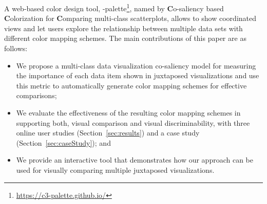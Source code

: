 A web-based color design tool, \toolname-palette\footnote{\small \url{https://c3-palette.github.io/}}, named by \textbf{C}o-saliency based \textbf{C}olorization for \textbf{C}omparing multi-class scatterplots, allows to show coordinated views and let users  explore the relationship between multiple data sets with different color mapping schemes.
The main contributions of this paper are as follows:
\begin{itemize}[noitemsep]
\setlength{\itemsep}{5pt}
  \item We propose a multi-class data visualization co-saliency model for measuring the importance of each data item shown in juxtaposed visualizations and use this metric to automatically generate color mapping schemes for effective comparisons;
   \item
   We evaluate the effectiveness of the resulting color mapping schemes in supporting both, visual comparison and visual discriminability, with three online user studies (Section~\ref{sec:results}) and a case study (Section~\ref{sec:caseStudy}); and
    \item
  We provide an interactive tool that demonstrates how our approach can be used for visually comparing multiple juxtaposed visualizations.


\end{itemize}

